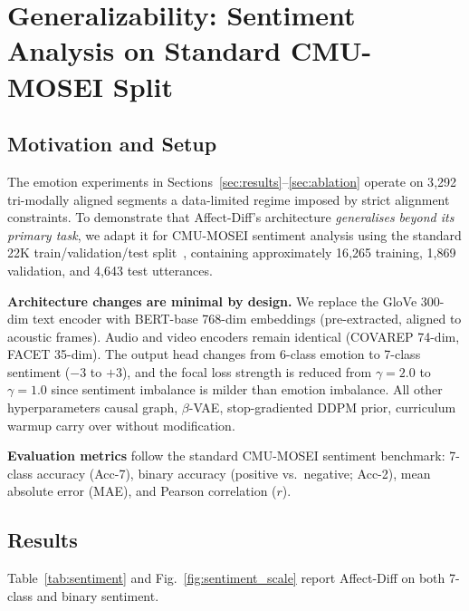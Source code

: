 \documentclass[conference]{IEEEtran}
\begin{document}
\section{Generalizability: Sentiment Analysis on Standard CMU-MOSEI Split}
\label{app:sentiment}

\subsection{Motivation and Setup}

The emotion experiments in Sections~\ref{sec:results}--\ref{sec:ablation}
operate on 3{,}292 tri-modally aligned segments   a data-limited regime
imposed by strict alignment constraints.
To demonstrate that Affect-Diff's architecture \emph{generalises beyond its
primary task}, we adapt it for CMU-MOSEI sentiment analysis using the standard
22K train/validation/test split~\cite{zadeh2018mosei}, containing
approximately 16{,}265 training, 1{,}869 validation, and 4{,}643 test
utterances.

\textbf{Architecture changes are minimal by design.}
We replace the GloVe 300-dim text encoder with BERT-base 768-dim embeddings
(pre-extracted, aligned to acoustic frames).  Audio and video encoders remain
identical (COVAREP 74-dim, FACET 35-dim).  The output head changes from
6-class emotion to 7-class sentiment ($-3$ to $+3$), and the focal loss
strength is reduced from $\gamma{=}2.0$ to $\gamma{=}1.0$ since sentiment
imbalance is milder than emotion imbalance.  All other hyperparameters
  causal graph, $\beta$-VAE, stop-gradiented DDPM prior, curriculum warmup
  carry over without modification.

\textbf{Evaluation metrics} follow the standard CMU-MOSEI sentiment benchmark:
7-class accuracy (Acc-7), binary accuracy (positive vs.\ negative; Acc-2),
mean absolute error (MAE), and Pearson correlation ($r$).

\subsection{Results}

Table~\ref{tab:sentiment} and Fig.~\ref{fig:sentiment_scale} report
Affect-Diff on both 7-class and binary sentiment.
\end{document}
